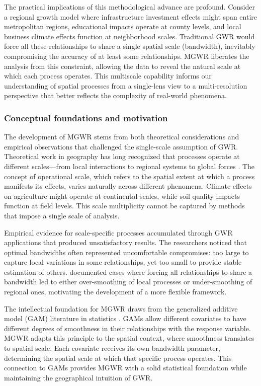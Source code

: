 \documentclass[smallextended, natbib]{svjour3}       %
\begin{document}
The practical implications of this methodological advance are profound. 
Consider a regional growth model where infrastructure investment effects might span entire metropolitan regions, educational impacts operate at county levels, and local business climate effects function at neighborhood scales. 
Traditional GWR would force all these relationships to share a single spatial scale (bandwidth), inevitably compromising the accuracy of at least some relationships. 
MGWR liberates the analysis from this constraint, allowing the data to reveal the natural scale at which each process operates. 
This multiscale capability informs our understanding of spatial processes from a single-lens view to a multi-resolution perspective that better reflects the complexity of real-world phenomena.

\subsubsection*{Conceptual foundations and motivation}

The development of MGWR stems from both theoretical considerations and empirical observations that challenged the single-scale assumption of GWR. 
Theoretical work in geography has long recognized that processes operate at different scales—from local interactions to regional systems to global forces \citep{Fotheringham2017}. 
The concept of operational scale, which refers to the spatial extent at which a process manifests its effects, varies naturally across different phenomena.
Climate effects on agriculture might operate at continental scales, while soil quality impacts function at field levels. 
This scale multiplicity cannot be captured by methods that impose a single scale of analysis.

Empirical evidence for scale-specific processes accumulated through GWR applications that produced unsatisfactory results.
The researchers noticed that optimal bandwidths often represented uncomfortable compromises: too large to capture local variations in some relationships, yet too small to provide stable estimation of others. 
\cite{Fotheringham2017} documented cases where forcing all relationships to share a bandwidth led to either over-smoothing of local processes or under-smoothing of regional ones, motivating the development of a more flexible framework.

The intellectual foundation for MGWR draws from the generalized additive model (GAM) literature in statistics \citep{hastie1990generalized}. 
GAMs allow different covariates to have different degrees of smoothness in their relationships with the response variable. 
MGWR adapts this principle to the spatial context, where smoothness translates to spatial scale. 
Each covariate receives its own bandwidth parameter, determining the spatial scale at which that specific process operates. 
This connection to GAMs provides MGWR with a solid statistical foundation while maintaining the geographical intuition of GWR.
\end{document}
